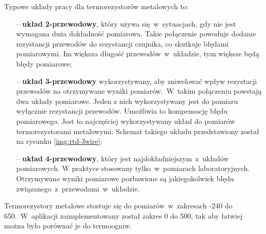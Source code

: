 Typowe układy pracy dla termorezystorów metalowych to:
\begin{itemize}
  \item [--] \textbf{układ 2-przewodowy}, który używa się~w~sytuacjach, gdy nie jest wymagana duża
        dokładność pomiarowa. Takie połączenie powoduje dodanie rezystancji przewodów do rezystancji
        czujnika, co skutkuje błędami pomiarowymi. Im większa długość przewodów~w~układzie, tym
        większe będą błędy pomiarowe;
  \item [--] \textbf{układ 3-przewodowy} wykorzystywany, aby zniwelować wpływ rezystacji przewodów
        na otrzymywane wyniki pomiarów.~W~takim połączeniu powstają dwa układy pomiarowe. Jeden z
        nich wykorzystywany jest do pomiaru wyłącznie rezystancji przewodów. Umożliwia to
        kompensację błędu pomiarowego. Jest to najczęściej wykorzystywany układ do pomiarów
        termorezystorami metalowymi. Schemat takiego układu przedstawiony został na rysunku
        \ref{img:rtd-3wire};
  \item [--] \textbf{układ 4-przewodowy}, który jest najdokładniejszym~z~układów pomiarowych. W
        praktyce stosowany tylko~w~pomiarach laboratoryjnych. Otrzymywane wyniki pomiarowe
        pozbawione są jakiegokolwiek błędu związanego~z~przewodami~w~układzie.
\end{itemize}


Termorezystory metalowe stostuje się do pomiarów~w~zakresach -240 do 650\degC.~W~aplikacji
zaimplementowany został zakres 0 do 500\degC, tak aby łatwiej można było porównać je do termoogniw.